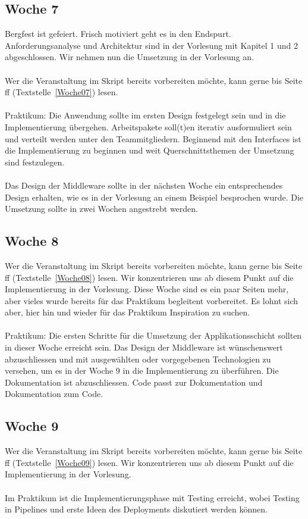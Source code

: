 \subsection{Woche 7}
Bergfest ist gefeiert.  Frisch motiviert geht es in den Endspurt.  Anforderungsanalyse und Architektur sind in der Vorlesung mit Kapitel 1 und 2 abgeschlossen. Wir nehmen nun die Umsetzung in der Vorlesung an.
\\\\
Wer die Veranstaltung im Skript bereits vorbereiten möchte, kann gerne bis Seite \pageref{Woche07}ff (Textstelle~\ref{Woche07})  lesen.
\\\\
Praktikum: Die Anwendung sollte im ersten Design festgelegt sein und in die Implementierung übergehen. Arbeitspakete soll(t)en iterativ ausformuliert sein und verteilt werden unter den Teammitgliedern. Beginnend mit den Interfaces ist die Implementierung zu beginnen und weit Querschnittsthemen der  Umsetzung sind festzulegen.
\\\\
Das Design der Middleware sollte in der nächsten Woche ein entsprechendes Design erhalten, wie es in der Vorlesung an einem Beispiel besprochen wurde. Die Umsetzung sollte in zwei Wochen angestrebt werden.

\subsection{Woche 8}
Wer die Veranstaltung im Skript bereits vorbereiten möchte, kann gerne bis Seite \pageref{Woche08}ff (Textstelle~\ref{Woche08})  lesen. Wir konzentrieren uns ab diesem Punkt auf die Implementierung in der Vorlesung. Diese Woche sind es ein paar Seiten mehr, aber vieles wurde bereits für das Praktikum begleitent vorbereitet. Es lohnt sich aber, hier hin und wieder für das Praktikum Inspiration zu suchen.
\\\\
Praktikum:  Die ersten Schritte für die Umsetzung der Applikationsschicht sollten in dieser Woche erreicht sein. Das Design der Middleware ist wünschenswert abzuschliessen und mit ausgewählten oder vorgegebenen Technologien zu versehen, um es in der Woche 9 in die Implementierung zu überführen. Die Dokumentation ist abzuschliessen. Code passt zur Dokumentation und Dokumentation zum Code.

\subsection{Woche 9}
Wer die Veranstaltung im Skript bereits vorbereiten möchte, kann gerne bis Seite \pageref{Woche09}ff (Textstelle~\ref{Woche09}) lesen. Wir konzentrieren uns ab diesem Punkt auf die Implementierung in der Vorlesung.
\\\\
Im Praktikum ist die Implementierungsphase mit Testing erreicht, wobei Testing in Pipelines und erste Ideen des Deployments diskutiert werden können.
